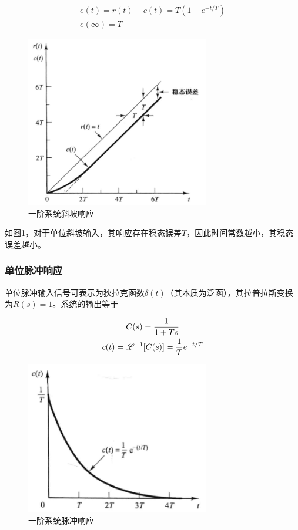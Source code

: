 \begin{gather*}
e(t)=r(t)-c(t)=T(1-e^{-t/T})\\
e(\infty)=T
\end{gather*}

\begin{figure}[!ht]
	\centering
	\includegraphics[width=8cm]{figures/7.png}
	\caption{一阶系统斜坡响应}
	\label{7}
\end{figure}

如图\ref{7}，对于单位斜坡输入，其响应存在稳态误差$T$，因此时间常数越小，其稳态误差越小。

\subsubsection{单位脉冲响应}

单位脉冲输入信号可表示为狄拉克函数$\delta(t)$（其本质为泛函），其拉普拉斯变换为$R(s)=1$。系统的输出等于

\begin{gather*}
C(s)=\frac{1}{1+Ts}\\
c(t)=\mathscr{L}^{-1}[C(s)]=\frac{1}{T}e^{-t/T}
\end{gather*}

\begin{figure}[!ht]
	\centering
	\includegraphics[width=8cm]{figures/8.png}
	\caption{一阶系统脉冲响应}
	\label{8}
\end{figure}

